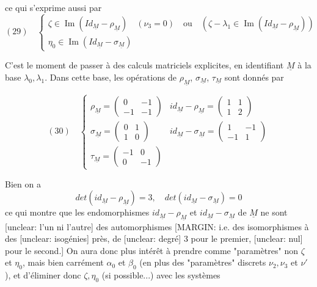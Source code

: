\newpage


ce qui s'exprime aussi par
$$
(29) \quad \begin{cases} \zeta \in \operatorname{Im}(Id_{\underline{M}} - \rho_{\underline{M}}) \quad (\nu_3=0) \quad \text{ou} \quad (\zeta - \lambda_1 \in \operatorname{Im}(Id_{\underline{M}} - \rho_{\underline{M}})) \\ \eta_0 \in \operatorname{Im}(Id_{\underline{M}} - \sigma_{\underline{M}}) \end{cases}
$$

C'est le moment de passer à des calculs matriciels explicites, en identifiant $\underline{M}$ à la base $\lambda_0, \lambda_1$. Dans cette base, les opérations de $\rho_{\underline{M}}$, $\sigma_{\underline{M}}$, $\tau_{\underline{M}}$ sont donnés par

$$
(30) \quad \begin{cases} \rho_{\underline{M}} = \begin{pmatrix} 0 & -1 \\ -1 & -1 \end{pmatrix} & id_{\underline{M}} - \rho_{\underline{M}} = \begin{pmatrix} 1 & 1 \\ 1 & 2 \end{pmatrix} \\ \sigma_{\underline{M}} = \begin{pmatrix} 0 & 1 \\ 1 & 0 \end{pmatrix} & id_{\underline{M}} - \sigma_{\underline{M}} = \begin{pmatrix} 1 & -1 \\ -1 & 1 \end{pmatrix} \\ \tau_{\underline{M}} = \begin{pmatrix} -1 & 0 \\ 0 & -1 \end{pmatrix} \end{cases}
$$

Bien on a
$$det(id_{\underline{M}} - \rho_{\underline{M}}) = 3, \quad det(id_{\underline{M}} - \sigma_{\underline{M}}) = 0$$
ce qui montre que les endomorphismes $id_{\underline{M}} - \rho_{\underline{M}}$ et $id_{\underline{M}} - \sigma_{\underline{M}}$ de $\underline{M}$ ne sont [unclear: l'un ni l'autre] des automorphismes
[MARGIN: i.e. des isomorphismes à des [unclear: isogénies] près, de [unclear: degré] 3 pour le premier, [unclear: nul] pour le second.]
On aura donc plus intérêt à prendre comme "paramètres" non $\zeta$ et $\eta_0$, mais bien carrément $\alpha_0$ et $\beta_0$ (en plus des "paramètres" discrets $\nu_2, \nu_3$ et $\nu'$), et d'éliminer donc $\zeta, \eta_0$ (si possible...) avec les systèmes

